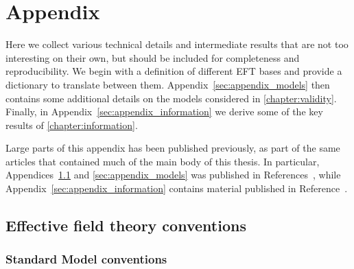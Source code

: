 
\chapter{Appendix}
\label{chapter:appendix}

Here we collect various technical details and intermediate results
that are not too interesting on their own, but should be included for
completeness and reproducibility. We begin with a definition of
different EFT bases and provide a dictionary to translate between
them. Appendix~\ref{sec:appendix_models} then contains some additional
details on the models considered in
\autoref{chapter:validity}. Finally, in
Appendix~\ref{sec:appendix_information} we derive some of the key
results of \autoref{chapter:information}.

Large parts of this appendix has been published previously, as part of
the same articles that contained much of the main body of this
thesis. In particular, Appendices~\ref{sec:appendix_bases} and
\ref{sec:appendix_models} was published in
References~\cite{Brehmer:2015rna, Biekotter:2016ecg}, while
Appendix~\ref{sec:appendix_information} contains material published in
Reference~\cite{Brehmer:2016nyr}.



\section{Effective field theory conventions}
\label{sec:appendix_bases}

\subsection{Standard Model conventions}
\label{sec:appendix_bases_sm}

